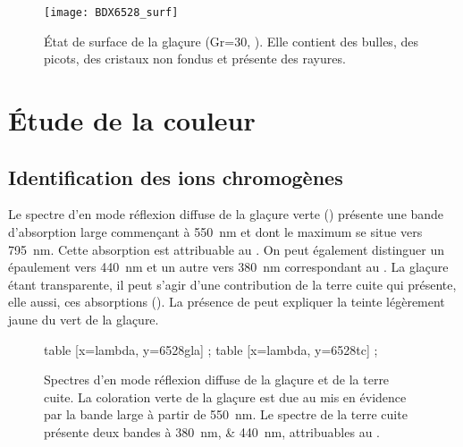 \begin{figure}[htb]
  \texttt{[image: BDX6528\_surf]}
  \caption[\ -- État de surface de la glaçure]
          {\legendeA 
           État de surface de la glaçure (Gr=30, ). Elle contient des 
           bulles, des picots, des cristaux non fondus et présente 
           des rayures.}
  \label{surf:6528}
\end{figure}


\section{Étude de la couleur}

\subsection{Identification des ions chromogènes}
Le spectre d'\AO en mode réflexion diffuse de la glaçure verte () présente une bande d'absorption large commençant à \SI{550}{nm} et dont le maximum se situe vers \SI{795}{nm}. Cette absorption est attribuable au  \autocite{Lajarte_1979}. On peut également distinguer un épaulement vers \SI{440}{nm} et un autre vers \SI{380}{nm} correspondant au . La glaçure étant transparente, il peut s'agir d'une contribution de la terre cuite qui présente, elle aussi, ces absorptions (). La présence de  peut expliquer la teinte légèrement jaune du vert de la glaçure.

\begin{figure}[htb]
  \begin{plotspectre}
       table [x=lambda, y=6528gla] {\gladata} ;
       table [x=lambda, y=6528tc] {\tcdata} ;
  \end{plotspectre}
  \caption[\ -- Spectres d'\AO en mode réflexion diffuse de la glaçure et de la terre cuite]
          {\legendeA
           Spectres d'\AO en mode réflexion diffuse de la glaçure et de la terre cuite. La coloration verte de la glaçure est due au  mis en évidence par la bande large à partir de \SI{550}{\nm}. Le spectre de la terre cuite présente deux bandes à \SIlist{380;440}{\nm}, attribuables au  \autocite{Lajarte_1979}.}
  \label{spectre:6528}
\end{figure}

